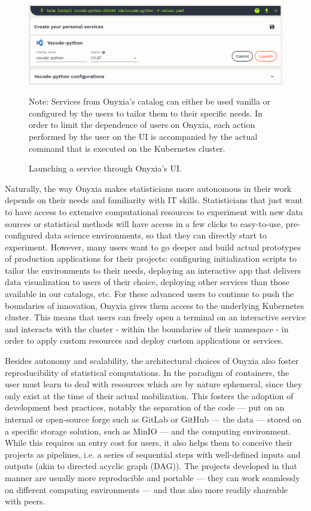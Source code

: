 \documentclass[graybox]{svmult}
\begin{document}
\begin{figure}[htbp]
    \includegraphics[width=\linewidth]{figures/service-configuration.png}
    \caption{Launching a service through Onyxia's UI.}
    \label{fig:service-configuration}
    \medskip
    {\footnotesize Note: Services from Onyxia's catalog can either be used vanilla or configured by the users to tailor them to their specific needs. In order to limit the dependence of users on Onyxia, each action performed by the user on the UI is accompanied by the actual command that is executed on the Kubernetes cluster.}
\end{figure}

Naturally, the way Onyxia makes statisticians more autonomous in their work depends on their needs and familiarity with IT skills. Statisticians that just want to have access to extensive computational resources to experiment with new data sources or statistical methods will have access in a few clicks to easy-to-use, pre-configured data science environments, so that they can directly start to experiment. However, many users want to go deeper and build actual prototypes of production applications for their projects: configuring initialization scripts to tailor the environments to their needs, deploying an interactive app that delivers data visualization to users of their choice, deploying other services than those available in our catalogs, etc. For these advanced users to continue to push the boundaries of innovation, Onyxia gives them access to the underlying Kubernetes cluster. This means that users can freely open a terminal on an interactive service and interacts with the cluster - within the boundaries of their namespace - in order to apply custom resources and deploy custom applications or services.

Besides autonomy and scalability, the architectural choices of Onyxia also foster reproducibility of statistical computations. In the paradigm of containers, the user must learn to deal with resources which are by nature ephemeral, since they only exist at the time of their actual mobilization. This fosters the adoption of development best practices, notably the separation of the code — put on an internal or open-source forge such as GitLab or GitHub — the data — stored on a specific storage solution, such as MinIO — and the computing environment. While this requires an entry cost for users, it also helps them to conceive their projects as pipelines, i.e. a series of sequential steps with well-defined inputs and outputs (akin to directed acyclic graph (DAG)). The projects developed in that manner are usually more reproducible and portable — they can work seamlessly on different computing environments — and thus also more readily shareable with peers.
\end{document}
